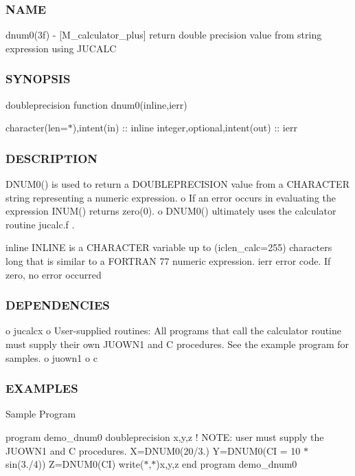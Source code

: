 \subsubsection*{N\+A\+ME}

dnum0(3f) -\/ \mbox{[}M\+\_\+calculator\+\_\+plus\mbox{]} return double precision value from string expression using J\+U\+C\+A\+LC \subsubsection*{S\+Y\+N\+O\+P\+S\+IS}

doubleprecision function dnum0(inline,ierr)

character(len=$\ast$),intent(in) \+:\+: inline integer,optional,intent(out) \+:\+: ierr

\subsubsection*{D\+E\+S\+C\+R\+I\+P\+T\+I\+ON}

D\+N\+U\+M0() is used to return a D\+O\+U\+B\+L\+E\+P\+R\+E\+C\+I\+S\+I\+ON value from a C\+H\+A\+R\+A\+C\+T\+ER string representing a numeric expression. o If an error occurs in evaluating the expression I\+N\+U\+M() returns zero(0). o D\+N\+U\+M0() ultimately uses the calculator routine jucalc.\+f .

inline I\+N\+L\+I\+NE is a C\+H\+A\+R\+A\+C\+T\+ER variable up to (iclen\+\_\+calc=255) characters long that is similar to a F\+O\+R\+T\+R\+AN 77 numeric expression. ierr error code. If zero, no error occurred

\subsubsection*{D\+E\+P\+E\+N\+D\+E\+N\+C\+I\+ES}

o jucalcx o User-\/supplied routines\+: All programs that call the calculator routine must supply their own J\+U\+O\+W\+N1 and C procedures. See the example program for samples. o juown1 o c \subsubsection*{E\+X\+A\+M\+P\+L\+ES}

Sample Program

program demo\+\_\+dnum0 doubleprecision x,y,z ! N\+O\+TE\+: user must supply the J\+U\+O\+W\+N1 and C procedures. X=D\+N\+U\+M0(\textquotesingle{}20/3.\textquotesingle{}) Y=D\+N\+U\+M0(\textquotesingle{}CI = 10 $\ast$ sin(3./4)\textquotesingle{}) Z=D\+N\+U\+M0(\textquotesingle{}CI\textquotesingle{}) write($\ast$,$\ast$)x,y,z end program demo\+\_\+dnum0


